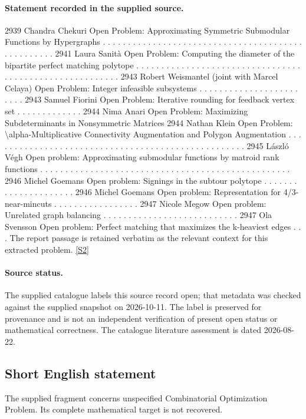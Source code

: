 \documentclass[11pt]{article}
\newcommand{\sref}[2]{\hyperlink{source:#1:#2}{[S#2]}}
\begin{document}
\paragraph{Statement recorded in the supplied source.}
2939 Chandra Chekuri Open Problem: Approximating Symmetric Submodular Functions by Hypergraphs . . . . . . . . . . . . . . . . . . . . . . . . . . . . . . . . . . . . . . . . . . . . . . . . . . 2941 Laura Sanità Open Problem: Computing the diameter of the bipartite perfect matching polytope . . . . . . . . . . . . . . . . . . . . . . . . . . . . . . . . . . . . . . . . . . . . . . . . . . . . . . . . 2943 Robert Weismantel (joint with Marcel Celaya) Open Problem: Integer infeasible subsystems . . . . . . . . . . . . . . . . . . . . . . . . 2943 Samuel Fiorini Open Problem: Iterative rounding for feedback vertex set . . . . . . . . . . . . . 2944 Nima Anari Open Problem: Maximizing Subdeterminants in Nonsymmetric Matrices 2944 Nathan Klein Open Problem: \textbackslash{}alpha-Multiplicative Connectivity Augmentation and Polygon Augmentation . . . . . . . . . . . . . . . . . . . . . . . . . . . . . . . . . . . . . . . . . . . . . . . . . . . 2945 László Végh Open problem: Approximating submodular functions by matroid rank functions . . . . . . . . . . . . . . . . . . . . . . . . . . . . . . . . . . . . . . . . . . . . . . . . . . 2946 Michel Goemans Open problem: Signings in the subtour polytope . . . . . . . . . . . . . . . . . . . . . 2946 Michel Goemans Open problem: Representation for 4/3-near-mincuts . . . . . . . . . . . . . . . . . 2947 Nicole Megow Open problem: Unrelated graph balancing . . . . . . . . . . . . . . . . . . . . . . . . . . . 2947 Ola Svensson Open problem: Perfect matching that maximizes the k-heaviest edges . . . The report passage is retained verbatim as the relevant context for this extracted problem. \sref{30004897}{2}
\paragraph{Source status.}
The supplied catalogue labels this source record open; that metadata was checked against the supplied snapshot on 2026-10-11. The label is preserved for provenance and is not an independent verification of present open status or mathematical correctness. The catalogue literature assessment is dated 2026-08-22.
\subsection{Short English statement}
The supplied fragment concerns unspecified Combinatorial Optimization Problem. Its complete mathematical target is not recovered.
\end{document}
